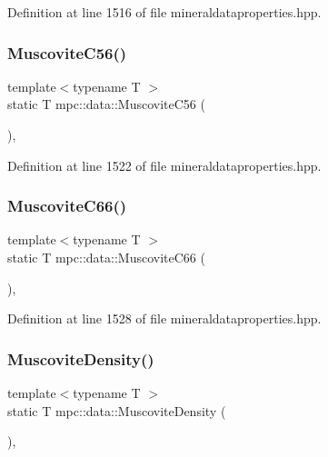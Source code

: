 Definition at line 1516 of file mineraldataproperties.\+hpp.

\mbox{\label{namespacempc_1_1data_a4b40024537e41e9799cd99f218eac085}} 
\subsubsection{\texorpdfstring{Muscovite\+C56()}{MuscoviteC56()}}
{\footnotesize\ttfamily template$<$typename T $>$ \\
static T mpc\+::data\+::\+Muscovite\+C56 (\begin{DoxyParamCaption}{ }\end{DoxyParamCaption})\hspace{0.3cm}{\ttfamily [inline]}, {\ttfamily [static]}}



Definition at line 1522 of file mineraldataproperties.\+hpp.

\mbox{\label{namespacempc_1_1data_a9e11d4170f85a523af28ca2f1b5feed7}} 
\subsubsection{\texorpdfstring{Muscovite\+C66()}{MuscoviteC66()}}
{\footnotesize\ttfamily template$<$typename T $>$ \\
static T mpc\+::data\+::\+Muscovite\+C66 (\begin{DoxyParamCaption}{ }\end{DoxyParamCaption})\hspace{0.3cm}{\ttfamily [inline]}, {\ttfamily [static]}}



Definition at line 1528 of file mineraldataproperties.\+hpp.

\mbox{\label{namespacempc_1_1data_a1651103d3745f7ac1765398e11555d33}} 
\subsubsection{\texorpdfstring{Muscovite\+Density()}{MuscoviteDensity()}}
{\footnotesize\ttfamily template$<$typename T $>$ \\
static T mpc\+::data\+::\+Muscovite\+Density (\begin{DoxyParamCaption}{ }\end{DoxyParamCaption})\hspace{0.3cm}{\ttfamily [inline]}, {\ttfamily [static]}}




